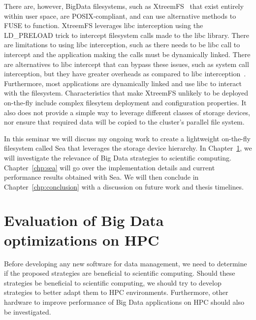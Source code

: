 \documentclass{report}
\begin{document}
    There are, however, BigData filesystems, such as XtreemFS~\cite{xtreemfs} that
    exist entirely within user space, are POSIX-compliant, and can use alternative
    methods to FUSE to function. XtreemFS leverages libc interception using the LD\_PRELOAD
    trick to intercept filesystem calls made to the libc library. There are
    limitations to using libc interception, such as there needs to be libc call to intercept and the 
    application making the calls must be dynamically linked.
    There are alternatives to libc intercept that can bypass these issues, such as
    system call interception, but they have greater overheads as compared to libc interception~\cite{quinson}.
    Furthermore, most applications are dynamically linked and use libc to interact
    with the filesystem. Characteristics that make XtreemFS unlikely to be deployed
    on-the-fly include complex filesytem deployment and configuration properties. It
    also does not provide a simple way to leverage different classes of storage
    devices, nor ensure that required data will be copied to the cluster's parallel file system.

    In this seminar we will discuss my ongoing work to create a lightweight on-the-fly filesystem
    called Sea that leverages the storage device hierarchy. In Chapter~\ref{chp:eval}, we
    will investigate the relevance of Big Data strategies to scientific computing. Chapter~\ref{chp:sea}
    will go over the implementation details and current performance results obtained with Sea. We will
    then conclude in Chapter~\ref{chp:conclusion} with a discussion on future work and thesis timelines.

    
    \chapter{Evaluation of Big Data optimizations on HPC}\label{chp:eval}

        Before developing any new software for data management, we need to
        determine if the proposed strategies are beneficial to scientific computing.
        Should these strategies be beneficial to scientific computing, we should try
        to develop strategies to better adapt them to HPC environments. Furthermore,
        other hardware to improve performance of Big Data applications on HPC
        should also be investigated.
\end{document}
